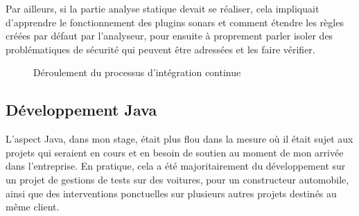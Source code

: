 Par ailleurs, si la partie analyse statique devait se réaliser, cela impliquait d'apprendre le fonctionnement des plugins sonars et comment étendre les règles créées par défaut par l'analyseur, pour ensuite à proprement parler isoler des problématiques de sécurité qui peuvent être adressées et les faire vérifier. 

\begin{figure}
  \centering
  \caption{Déroulement du processus d'intégration continue}
  \label{fig:ci_flow}
\end{figure}

\subsection{Développement Java}
L'aspect Java, dans mon stage, était plus flou dans la mesure où il était sujet aux projets qui seraient en cours et en besoin de soutien au moment de mon arrivée dans l'entreprise. En pratique, cela a été majoritairement du développement sur un projet de gestions de tests sur des voitures, pour un constructeur automobile, ainsi que des interventions ponctuelles sur plusieurs autres projets destinés au même client.

